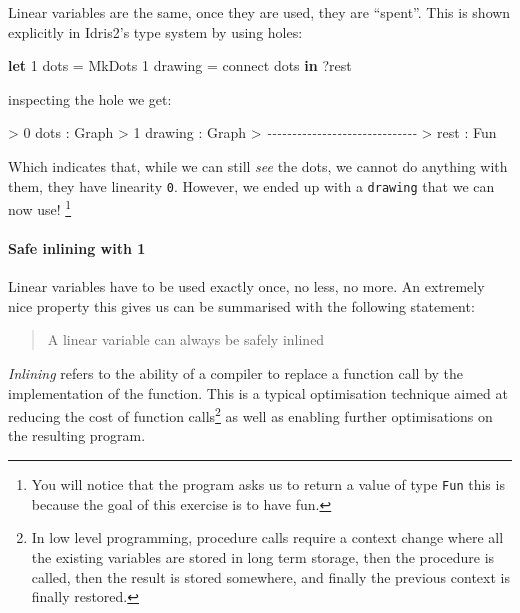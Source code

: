 \documentclass[
]{article}
\newenvironment{Shaded}{}{}
\newcommand{\CommentTok}[1]{\textcolor[rgb]{0.38,0.63,0.69}{\textit{#1}}}
\newcommand{\DataTypeTok}[1]{\textcolor[rgb]{0.56,0.13,0.00}{#1}}
\newcommand{\DecValTok}[1]{\textcolor[rgb]{0.25,0.63,0.44}{#1}}
\newcommand{\KeywordTok}[1]{\textcolor[rgb]{0.00,0.44,0.13}{\textbf{#1}}}
\newcommand{\NormalTok}[1]{#1}
\newcommand{\OperatorTok}[1]{\textcolor[rgb]{0.40,0.40,0.40}{#1}}
\newcommand{\OtherTok}[1]{\textcolor[rgb]{0.00,0.44,0.13}{#1}}
\begin{document}
Linear variables are the same, once they are used, they are ``spent''.
This is shown explicitly in Idris2's type system by using holes:

\begin{Shaded}
\begin{Highlighting}[]
\KeywordTok{let} \DecValTok{1}\NormalTok{ dots }\OtherTok{=} \DataTypeTok{MkDots}
    \DecValTok{1}\NormalTok{ drawing }\OtherTok{=}\NormalTok{ connect dots }\KeywordTok{in}
    \OperatorTok{?}\NormalTok{rest}
\end{Highlighting}
\end{Shaded}

inspecting the hole we get:

\begin{Shaded}
\begin{Highlighting}[]
\OperatorTok{\textgreater{}}  \DecValTok{0}\NormalTok{ dots }\OperatorTok{:} \DataTypeTok{Graph}
\OperatorTok{\textgreater{}}  \DecValTok{1}\NormalTok{ drawing }\OperatorTok{:} \DataTypeTok{Graph}
\OperatorTok{\textgreater{}} \CommentTok{{-}{-}{-}{-}{-}{-}{-}{-}{-}{-}{-}{-}{-}{-}{-}{-}{-}{-}{-}{-}{-}{-}{-}{-}{-}{-}{-}{-}{-}{-}}
\OperatorTok{\textgreater{}}\NormalTok{ rest }\OperatorTok{:} \DataTypeTok{Fun}
\end{Highlighting}
\end{Shaded}

Which indicates that, while we can still \emph{see} the dots, we cannot
do anything with them, they have linearity \texttt{0}. However, we ended
up with a \texttt{drawing} that we can now use! \footnote{You will
  notice that the program asks us to return a value of type \texttt{Fun}
  this is because the goal of this exercise is to have fun.}

\hypertarget{safe-inlining-with-1}{%
\paragraph{Safe inlining with 1}\label{safe-inlining-with-1}}

Linear variables have to be used exactly once, no less, no more. An
extremely nice property this gives us can be summarised with the
following statement:

\begin{quote}
A linear variable can always be safely inlined
\end{quote}

\emph{Inlining} refers to the ability of a compiler to replace a
function call by the implementation of the function. This is a typical
optimisation technique aimed at reducing the cost of function
calls\footnote{In low level programming, procedure calls require a
  context change where all the existing variables are stored in long
  term storage, then the procedure is called, then the result is stored
  somewhere, and finally the previous context is finally restored.} as
well as enabling further optimisations on the resulting program.
\end{document}
